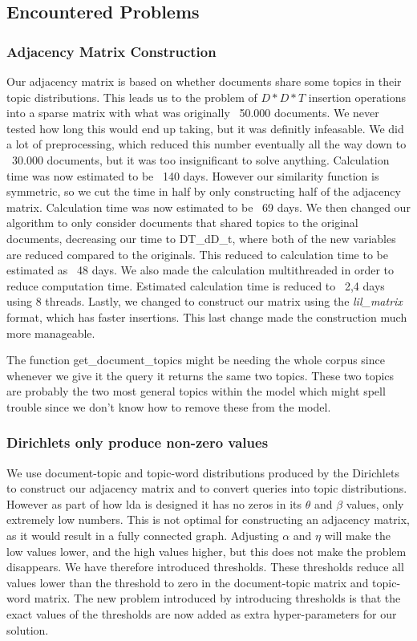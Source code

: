 \subsection{Encountered Problems}

\subsubsection{Adjacency Matrix Construction}
Our adjacency matrix is based on whether documents share some topics in their topic distributions. 
This leads us to the problem of $D*D*T$ insertion operations into a sparse matrix with what was originally ~50.000 documents. We never tested how long this would end up taking, but it was definitly infeasable.
We did a lot of preprocessing, which reduced this number eventually all the way down to ~30.000 documents, but it was too insignificant to solve anything. Calculation time was now estimated to be ~140 days.
However our similarity function is symmetric, so we cut the time in half by only constructing half of the adjacency matrix. Calculation time was now estimated to be ~69 days.
We then changed our algorithm to only consider documents that shared topics to the original documents, decreasing our time to D\*T\_d\*D\_t, where both of the new variables are reduced compared to the originals. This reduced to calculation time to be estimated as ~48 days.
We also made the calculation multithreaded in order to reduce computation time. Estimated calculation time is reduced to ~2,4 days using 8 threads.
Lastly, we changed to construct our matrix using the \emph{lil\_matrix} format, which has faster insertions. This last change made the construction much more manageable.


The function get\_document\_topics might be needing the whole corpus since whenever we give it the query it returns the same two topics. 
These two topics are probably the two most general topics within the model which might spell trouble since we don't know how to remove these from the model.

\subsubsection{Dirichlets only produce non-zero values}
We use document-topic and topic-word distributions produced by the Dirichlets to construct our adjacency matrix and to convert queries into topic distributions. 
However as part of how \gls{lda} is designed it has no zeros in its $\theta$ and $\beta$ values, only extremely low numbers.
This is not optimal for constructing an adjacency matrix, as it would result in a fully connected graph.
Adjusting $\alpha$ and $\eta$ will make the low values lower, and the high values higher, but this does not make the problem disappears.
We have therefore introduced thresholds.
These thresholds reduce all values lower than the threshold to zero in the document-topic matrix and topic-word matrix.
The new problem introduced by introducing thresholds is that the exact values of the thresholds are now added as extra hyper-parameters for our solution.
